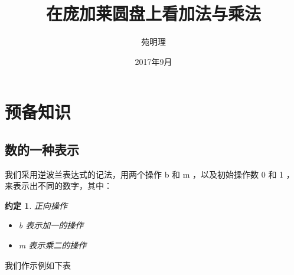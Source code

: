 \documentclass[a4paper,12pt]{article}
\title{在庞加莱圆盘上看加法与乘法}
\author{苑明理}
\date{2017年9月}
\newtheorem{convention}{约定}
\begin{document}
\maketitle{}

\renewcommand\contentsname{目录}
\setcounter{tocdepth}{2}
\tableofcontents

\newpage

\section{预备知识}

\subsection{数的一种表示}

我们采用逆波兰表达式的记法，用两个操作 b 和 m ，以及初始操作数 0 和 1 ，来表示出不同的数字，其中：

\begin{convention}
正向操作
\begin{itemize}
\item b 表示加一的操作
\item m 表示乘二的操作
\end{itemize}
\end{convention}

我们作示例如下表
\end{document}
